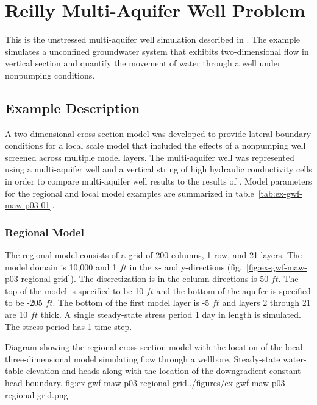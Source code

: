 \section{Reilly Multi-Aquifer Well Problem}

This is the unstressed multi-aquifer well simulation described in \cite{reilly1989bias}. The example simulates a unconfined groundwater system that exhibits two-dimensional flow in vertical section and quantify the movement of water through a well under nonpumping conditions.                               

\subsection{Example Description}

A two-dimensional cross-section model was developed to provide lateral boundary conditions for a local scale model that included the effects of a nonpumping well screened across multiple model layers. The multi-aquifer well was represented using a multi-aquifer well and a vertical string of high hydraulic conductivity cells in order to compare multi-aquifer well results to the results of \cite{reilly1989bias}. Model parameters for the regional and local model examples are summarized in table~\ref{tab:ex-gwf-maw-p03-01}.



\subsubsection{Regional Model}

The regional model consists of a grid of 200 columns, 1 row, and 21 layers. The model domain is 10,000 and 1 $ft$ in the x- and y-directions (fig.~\ref{fig:ex-gwf-maw-p03-regional-grid}). The discretization is in the column directions is 50 $ft$. The top of the model is specified to be 10 $ft$ and the bottom of the aquifer is specified to be -205 $ft$. The bottom of the first model layer is -5 $ft$ and layers 2 through 21 are 10 $ft$ thick. A single steady-state stress period 1 day in length is simulated. The stress period has 1 time step.

\begin{StandardFigure}{
                                     Diagram showing the regional cross-section model with the location of the 
                                     local three-dimensional model simulating flow through a wellbore. Steady-state
                                     water-table elevation and heads along with the location of the downgradient 
                                     constant head boundary.
                                     }{fig:ex-gwf-maw-p03-regional-grid}{../figures/ex-gwf-maw-p03-regional-grid.png}
\end{StandardFigure}   


